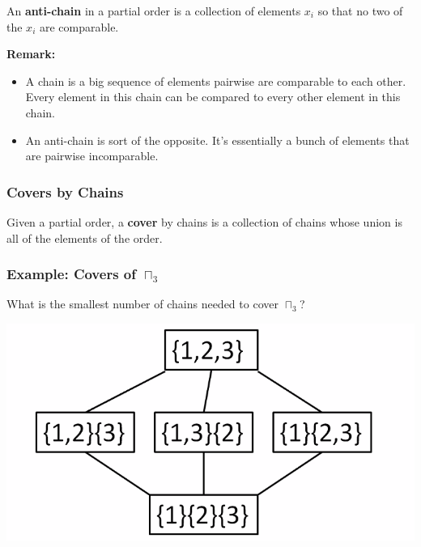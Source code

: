 \documentclass[letterpaper]{article}
\begin{document}
\begin{definition}{}{}
    An \textbf{anti-chain} in a partial order is a collection of elements $x_i$ so that no two of the $x_i$ are comparable. 
\end{definition}

\textbf{Remark:}
\begin{itemize}
    \item A chain is a big sequence of elements pairwise are comparable to each other. Every element in this chain can be compared to every other element in this chain. 
    \item An anti-chain is sort of the opposite. It's essentially a bunch of elements that are pairwise incomparable. 
\end{itemize}

\subsubsection{Covers by Chains}
\begin{definition}{}{}
    Given a partial order, a \textbf{cover} by chains is a collection of chains whose union is all of the elements of the order. 
\end{definition}

\subsubsection{Example: Covers of \texorpdfstring{$\sqcap_3$}{Set of Set Partitions of [3] Ordered by Refinement}}
What is the smallest number of chains needed to cover $\sqcap_3$?
\begin{center}
    \includegraphics[scale=0.3]{ex_hasse.PNG}
\end{center}
\end{document}
